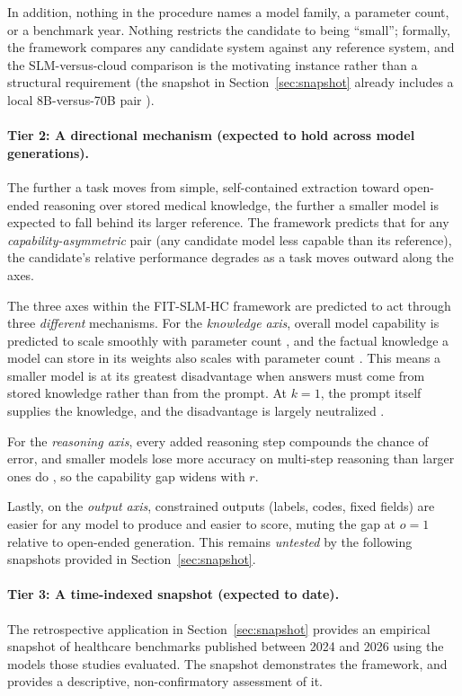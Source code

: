 \documentclass[11pt]{article}
\begin{document}
In addition, nothing in the procedure names a model family, a parameter count, or a benchmark year. Nothing restricts the candidate to being ``small''; formally, the framework compares any candidate system against any reference system, and the SLM-versus-cloud comparison is the motivating instance rather than a structural requirement (the snapshot in Section~\ref{sec:snapshot} already includes a local 8B-versus-70B pair \cite{Builtjes2025}).

\paragraph{Tier 2: A directional mechanism (expected to hold across model generations).}
The further a task moves from simple, self-contained extraction toward open-ended reasoning over stored medical knowledge, the further a smaller model is expected to fall behind its larger reference. The framework predicts that for any \emph{capability-asymmetric} pair (any candidate model less capable than its reference), the candidate's relative performance degrades as a task moves outward along the axes.

The three axes within the FIT-SLM-HC framework are predicted to act through three \emph{different} mechanisms. For the \emph{knowledge axis}, overall model capability is predicted to scale smoothly with parameter count \cite{Kaplan2020}, and the factual knowledge a model can store in its weights also scales with parameter count \cite{AllenZhu2024}. This means a smaller model is at its greatest disadvantage when answers must come from stored knowledge rather than from the prompt. At $k=1$, the prompt itself supplies the knowledge, and the disadvantage is largely neutralized \cite{Lewis2020, Mallen2023}.

For the \emph{reasoning axis}, every added reasoning step compounds the chance of error, and smaller models lose more accuracy on multi-step reasoning than larger ones do \cite{Wei2022, Dziri2023}, so the capability gap widens with $r$.

Lastly, on the \emph{output axis}, constrained outputs (labels, codes, fixed fields) are easier for any model to produce and easier to score, muting the gap at $o=1$ relative to open-ended generation. This remains \emph{untested} by the following snapshots provided in Section~\ref{sec:snapshot}.

\paragraph{Tier 3: A time-indexed snapshot (expected to date).}
The retrospective application in Section~\ref{sec:snapshot} provides an empirical snapshot of healthcare benchmarks published between 2024 and 2026 using the models those studies evaluated. The snapshot demonstrates the framework, and provides a descriptive, non-confirmatory assessment of it.
\end{document}
